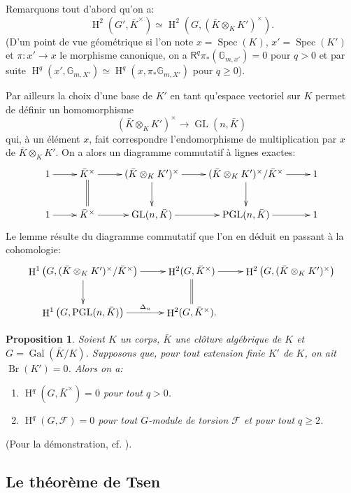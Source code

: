 \documentclass{book}
\DeclareMathOperator{\br}{Br}
\DeclareMathOperator{\gal}{Gal}
\DeclareMathOperator{\gl}{GL}
\DeclareMathOperator{\h}{H}
\DeclareMathOperator{\pgl}{PGL}
\DeclareMathOperator{\spec}{Spec}
\newcommand{\cF}{\mathcal{F}}
\newcommand{\dG}{\mathbb{G}}
\newcommand{\R}{\mathsf{R}}
\newtheorem{proposition}[subsubsection]{Proposition}
\begin{document}
Remarquons tout d'abord qu'on a: 
\[
  \h^2(G',\bar K^\times) \simeq \h^2\left(G,(\bar K\otimes_K K')^\times\right)\text{.}
\]
(D'un point de vue géométrique si l'on note $x=\spec(K)$, $x'=\spec(K')$ et 
$\pi:x'\to x$ le morphisme canonique, on a $\R^q \pi_*(\dG_{m,x'}) = 0$ pour 
$q>0$ et par suite $\h^q(x',\dG_{m,X'})\simeq \h^q(x,\pi_*\dG_{m,X'})$ pour 
$q\geqslant 0$). 

Par ailleurs la choix d'une base de $K'$ en tant qu'espace vectoriel sur $K$ 
permet de définir un homomorphisme 
\[
  (\bar K\otimes_K K')^\times \to \gl(n,\bar K)
\]
qui, à un élément $x$, fait correspondre l'endomorphisme de 
multiplication par $x$ de $\bar K\otimes_K K'$. On a alors un diagramme 
commutatif à lignes exactes: 
\[\xymatrix{
  1 \ar[r] 
    & \bar K^\times \ar[r] \ar@{=}[d]
    & (\bar K\otimes_K K')^\times \ar[r] \ar[d] 
    & (\bar K\otimes_K K')^\times / \bar K^\times \ar[r] \ar[d] 
    & 1 \\
  1 \ar[r] 
    & \bar K^\times \ar[r] 
    & \gl(n,\bar K) \ar[r] 
    & \pgl(n,\bar K) \ar[r] 
    & 1
}\]
Le lemme résulte du diagramme commutatif que l'on en déduit en passant 
à la cohomologie:
\[\xymatrix{
  \h^1\left(G,(\bar K\otimes_K K')^\times/\bar K^\times\right) \ar[r] \ar[d] 
    & \h^2(G,\bar K^\times) \ar[r] \ar@{=}[d]
    & \h^2\left(G,(\bar K\otimes_K K')^\times\right) \\
  \h^1\left(G,\pgl(n,\bar K)\right) \ar[r]^-{\Delta_n} 
    & \h^2(G,\bar K^\times) \text{.}
}\]





\begin{proposition}\label{I:3-1-6}
Soient $K$ un corps, $\bar K$ une clôture algébrique de $K$ et 
$G=\gal(\bar K/K)$. Supposons que, pour tout extension finie $K'$ de $K$, on 
ait $\br(K')=0$. Alors on a:
\begin{enumerate}[\indent i)]
  \item $\h^q(G,\bar K^\times) = 0$ pour tout $q>0$.
  \item $\h^q(G,\cF) = 0$ pour tout $G$-module de torsion $\cF$ et pour tout 
    $q\geqslant 2$.
\end{enumerate}
\end{proposition}

(Pour la démonstration, cf. \cite{14}).










\subsection{Le théorème de Tsen}\label{I:3-2}
\end{document}
